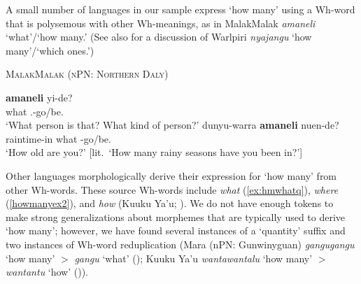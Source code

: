 \documentclass[12pt,egregdoesnotlikesansseriftitles]{scrartcl}
\begin{document}
A small number of languages in our sample express `how many' using a Wh-word that is polysemous with other Wh-meanings, as in MalakMalak \textit{amaneli} `what'/`how many.' (See also  \citealt[15-16]{bittnerhale95} for a discussion of Warlpiri \textit{nyajangu} `how many'/`which ones.')

\begin{exe}
  \ex\label{ex:whathm}\textsc{MalakMalak (nPN: Northern Daly)}\hfill {}
  \begin{xlist}
    \ex\gll \textbf{amaneli} yi-de?\\
    what \Tsg.\M-go/be.\Prs\\
    \glt `What person is that? What kind of person?'
    \ex\gll dunyu-warra \textbf{amaneli} nuen-de?\\
    raintime-in what \Ssg-go/be.\Prs\\
    \glt `How old are you?' [lit.\ `How many rainy seasons have you been in?']
    
    
  \end{xlist}
 \end{exe}
 
 
 Other languages morphologically derive their expression for `how many' from other Wh-words. These source Wh-words include \textit{what} (\ref{ex:hmwhatq}), \textit{where} (\ref{howmanyex2}), and \textit{how} (Kuuku Ya'u; \citealt{thompson88}). We do not have enough tokens to make strong generalizations about morphemes that are typically used to derive `how many'; however, we have found several instances of a `quantity' suffix and two instances of Wh-word reduplication (Mara (nPN: Gunwinyguan) \textit{gangugangu} `how many' $>$ \textit{gangu} `what' (\citealt[174]{heath81}); Kuuku Ya'u  \textit{wantawantalu} `how many' $>$ \textit{wantantu} `how' (\citealt[91]{thompson88})).

  
\end{document}
